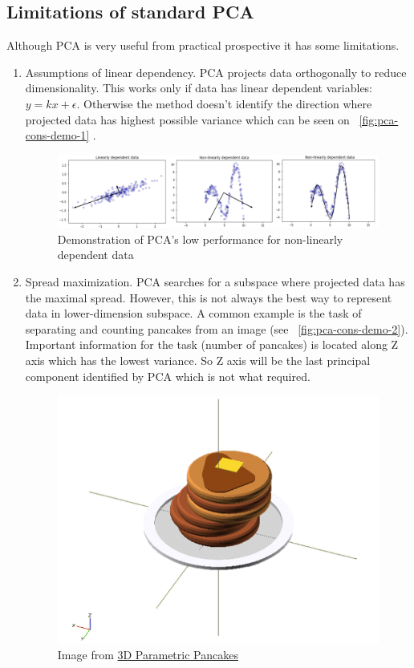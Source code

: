 \subsection{Limitations of standard PCA}\label{limitations}
Although PCA is very useful from practical prospective it has some limitations.
\begin{enumerate}
	\item Assumptions of linear dependency.
	PCA projects data orthogonally to reduce dimensionality. This works only if data has linear dependent variables:  $y = k x + \epsilon$. Otherwise the method doesn't identify the direction where  projected data has highest possible variance which can be seen on   ~\autoref{fig:pca-cons-demo-1} . 
	
	\begin{figure}[h]
		\centering
		\includegraphics[scale=0.5]{img/pca-linear-separation-demo.png}
		\caption{\label{fig:pca-cons-demo-1}Demonstration of PCA's low performance for non-linearly dependent data}
	\end{figure}
	
	\item Spread maximization. 
	PCA searches for a subspace where projected data has the maximal spread. However, this is not always the best way to represent data in lower-dimension subspace. A common example is the task of separating and counting pancakes from an image (see ~\autoref{fig:pca-cons-demo-2}). Important information for the task (number of pancakes) is located along Z axis which has the lowest variance. So Z axis will be the last principal component identified by PCA which is not what required. 
	
	\begin{figure}
		\centering
		\includegraphics[width=.5\textwidth, scale=0.4]{img/pancakes-white.png}
		\caption{\label{fig:pca-cons-demo-2}Image from  \href{http://golancourses.net/2014/kevan/01/23/3d-parametric-pancakes/}{3D Parametric Pancakes}
		}
	\end{figure}
	

\end{enumerate}
